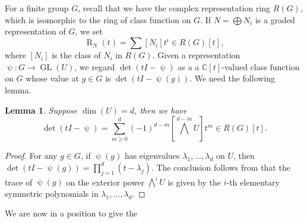 \documentclass{amsart}
\newtheorem{lemma}[theorem]{Lemma}
\theoremstyle{definition}
\theoremstyle{remark}
\numberwithin{equation}{section}
\begin{document}
For a finite group $G$, recall that we have the complex representation ring $R(G)$, which is isomorphic to the ring of class function on $G$. If $N=\bigoplus N_i$ is a graded representation of $G$, we set
$$
\operatorname{R}_{N}(t)=\sum\left[N_i\right] t^i \in R(G)[t],
$$
where $\left[N_i\right]$ is the class of $N_i$ in $R(G)$. Given a representation $\operatorname{\psi}: G \rightarrow \operatorname{GL}(U)$, we regard $\operatorname{det}(tI-\operatorname{\psi})$ as a a $\mathbb{C}[t]$-valued class function on $G$ whose value at $g \in G$ is $\operatorname{det}(tI-\operatorname{\psi}(g))$. We need the following lemma.

\begin{lemma} \label{lem-ext}
Suppose $\operatorname{dim}(U)=d$, then we have
$$
\operatorname{det}(tI-\operatorname{\psi} )=\sum_{m \geq 0}^{d}(-1)^{d-m}\left[\bigwedge^{d-m} U\right] t^m \in R(G)[t].
$$
\end{lemma}

\begin{proof}
 For any $g \in G$, if $\operatorname{\psi}(g)$ has eigenvalues $\lambda_1, \ldots, \lambda_d$ on $U$, then $\operatorname{det}(tI-\operatorname{\psi}(g) )=\prod_{j=1}^{d}\left(t-\lambda_j\right)$. The conclusion follows from that the trace of $\operatorname{\psi}(g)$ on the exterior power $\bigwedge^{i} U$ is given by the $i$-th elementary symmetric polynomials in $\lambda_1, \ldots, \lambda_d$.
\end{proof}

We are now in a position to give the 
\end{document}
